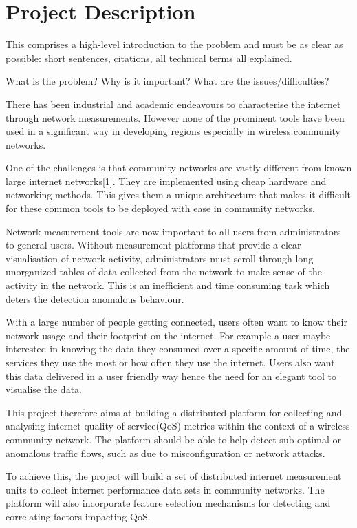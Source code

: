  \section{Project Description}
 This comprises a high-level introduction to the problem and must be as clear as possible: short sentences, citations, all technical terms all explained.
 
What is the problem? Why is it important? What are the issues/difficulties?

There has been industrial and academic endeavours to characterise the internet through network measurements. However none of the prominent tools have been used in a significant way in developing regions especially in wireless community networks.

One of the challenges is that community networks are vastly different from known large internet networks[1]. They are implemented using cheap hardware and networking methods. This gives them a unique architecture that makes it difficult for these common tools to be deployed with ease in community networks.

Network measurement tools are now important to all users from administrators to general users. Without measurement platforms that provide a clear visualisation of network activity, administrators must scroll through long unorganized tables of data collected from the network to make sense of the activity in the network. This is an inefficient and time consuming task which deters the detection anomalous behaviour.

With a large number of people getting connected, users often want to know their network usage and their footprint on the internet. For example a user maybe interested in knowing the data they consumed over a specific amount of time, the services they use the most or how often they use the internet. Users also want this data delivered in a user friendly way hence the need for an elegant tool to visualise the data.

This project therefore aims at building a distributed platform for collecting and analysing internet quality of service(QoS) metrics within the context of a wireless community network. The platform should be able to help detect sub-optimal or anomalous traffic flows, such as due to misconfiguration or network attacks.

To achieve this, the project will build a set of distributed internet measurement units to collect internet performance data sets in community networks. The platform will also incorporate feature selection mechanisms for detecting and correlating factors impacting QoS.

